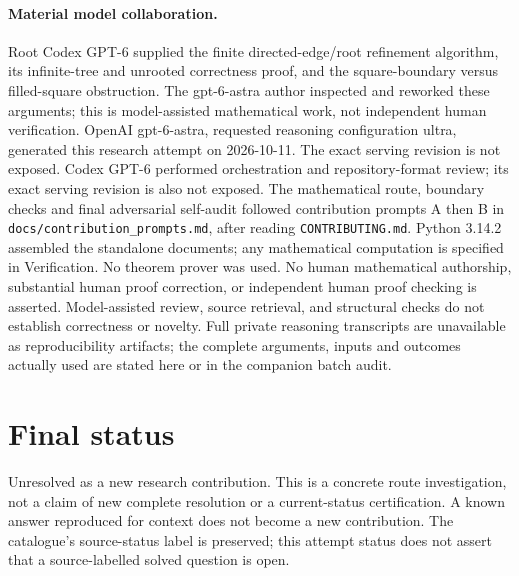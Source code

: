 \documentclass[11pt]{article}
\begin{document}
\paragraph{Material model collaboration.} Root Codex GPT-6 supplied the finite directed-edge/root refinement algorithm, its infinite-tree and unrooted correctness proof, and the square-boundary versus filled-square obstruction. The gpt-6-astra author inspected and reworked these arguments; this is model-assisted mathematical work, not independent human verification.
OpenAI gpt-6-astra, requested reasoning configuration ultra, generated this research
attempt on 2026-10-11. The exact serving revision is not exposed. Codex GPT-6
performed orchestration and repository-format review; its exact serving revision
is also not exposed. The mathematical route, boundary checks and final adversarial
self-audit followed contribution prompts A then B in
\texttt{docs/contribution\_prompts.md}, after reading \texttt{CONTRIBUTING.md}.
Python 3.14.2 assembled the standalone documents; any mathematical computation is
specified in Verification. No theorem prover was used. No human mathematical
authorship, substantial human proof correction, or independent human proof checking
is asserted. Model-assisted review, source retrieval, and structural checks do not
establish correctness or novelty. Full private reasoning transcripts are unavailable
as reproducibility artifacts; the complete arguments, inputs and outcomes actually
used are stated here or in the companion batch audit.
\section{Final status}
Unresolved as a new research contribution. This is a concrete route investigation,
not a claim of new complete resolution or a current-status certification. A known
answer reproduced for context does not become a new contribution. The catalogue's
source-status label is preserved; this attempt status does not assert that a
source-labelled solved question is open.
\end{document}
